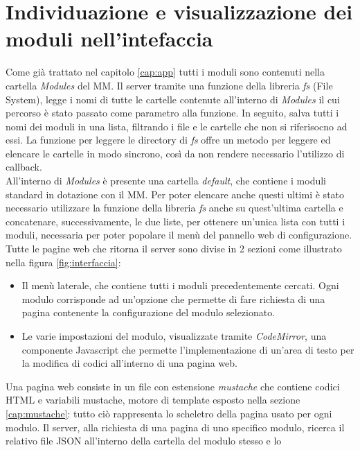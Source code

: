 \section{Individuazione e visualizzazione dei moduli nell'intefaccia}\label{cap:individuazione}
Come gi\`a trattato nel capitolo \ref{cap:app} tutti i moduli sono contenuti nella
cartella \textit{Modules} del MM. Il server tramite una funzione della libreria \textit{fs} (File System),
legge i nomi di tutte le cartelle contenute all'interno di \textit{Modules} il cui percorso \`e stato passato
come parametro alla funzione. In seguito, salva tutti i nomi dei moduli
in una lista, filtrando i file e le cartelle che non si riferisocno ad essi.
La funzione per leggere le directory di \textit{fs} offre un metodo per leggere ed elencare le cartelle in
modo sincrono, cos\`i da non rendere necessario l'utilizzo di callback.\\
All'interno di \textit{Modules} \`e presente una cartella \textit{default}, che contiene
i moduli standard in dotazione con il MM. Per poter elencare anche questi ultimi \`e stato necessario utilizzare la funzione
della libreria \textit{fs} anche su quest'ultima cartella e concatenare, successivamente, le due liste,
per ottenere un'unica lista con tutti i moduli, necessaria per poter popolare il men\`u del pannello web di configurazione.\\
Tutte le pagine web che ritorna il server sono divise in 2 sezioni come illustrato nella figura \ref{fig:interfaccia}:
\begin{itemize}
\item Il men\`u laterale, che contiene tutti i moduli precedentemente cercati. Ogni modulo corrisponde ad un'opzione che permette di fare richiesta di una pagina
contenente la configurazione del modulo selezionato.
\item Le varie impostazioni del modulo, visualizzate tramite \textit{CodeMirror}\cite{CodeMirror}, una componente Javascript
che permette l'implementazione di un'area di testo per la modifica di codici all'interno di una pagina web.\\[1\baselineskip]
\end{itemize}
Una pagina web consiste in un file con estensione \textit{mustache} che contiene
codici HTML e variabili mustache, motore di template esposto nella sezione \ref{cap:mustache}: tutto ci\`o rappresenta lo
scheletro della pagina usato per ogni modulo.
Il server, alla richiesta di una pagina di uno specifico modulo, ricerca il relativo file JSON all'interno della cartella del modulo stesso e lo

